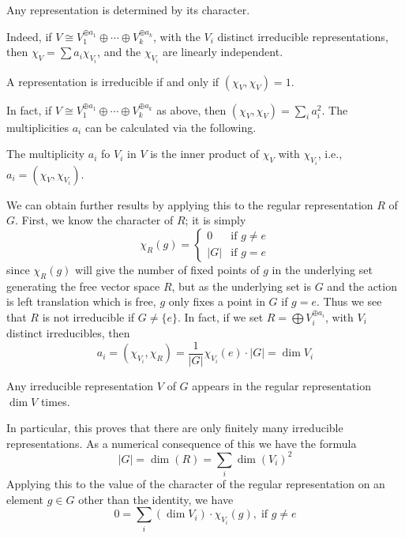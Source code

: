 \begin{corollary}
    Any representation is determined by its character.
\end{corollary}
Indeed, if $V\cong V_1^{\oplus a_1}\oplus \cdots \oplus V_k^{\oplus a_k}$, with the $V_i$ distinct irreducible representations, then $\chi_V = \sum a_i\chi_{V_i}$, and the $\chi_{V_i}$ are linearly independent.

\begin{corollary}
     A representation is irreducible if and only if $(\chi_V,\chi_V) = 1$.
\end{corollary}
In fact, if $V \cong V_1^{\oplus a_1}\oplus \cdots \oplus V_k^{\oplus a_k}$ as above, then $(\chi_V,\chi_V) = \sum_ia_i^2$. The multiplicities $a_i$ can be calculated via the following.

\begin{corollary}
    The multiplicity $a_i$ fo $V_i$ in $V$ is the inner product of $\chi_V$ with $\chi_{V_i}$, i.e., $a_i = (\chi_V,\chi_{V_i})$.
\end{corollary}

We can obtain further results by applying this to the regular representation $R$ of $G$. First, we know the character of $R$; it is simply \begin{equation*}
    \chi_R(g) = \left\{\begin{array}{lc} 0 & \text{if } g\neq e \\ |G| & \text{if } g= e\end{array}\right.
\end{equation*}
since $\chi_R(g)$ will give the number of fixed points of $g$ in the underlying set generating the free vector space $R$, but as the underlying set is $G$ and the action is left translation which is free, $g$ only fixes a point in $G$ if $g = e$. Thus we see that $R$ is not irreducible if $G \neq \{e\}$. In fact, if we set $R = \bigoplus V_i^{\oplus a_i}$, with $V_i$ distinct irreducibles, then \begin{equation*}
    a_i = (\chi_{V_i},\chi_R) = \frac{1}{|G|}\chi_{V_i}(e)\cdot|G| = \dim V_i
\end{equation*}
\begin{corollary}
    Any irreducible representation $V$ of $G$ appears in the regular representation $\dim V$ times.
\end{corollary}
In particular, this proves that there are only finitely many irreducible representations. As a numerical consequence of this we have the formula \begin{equation}
    |G| = \dim(R) = \sum_i\dim(V_i)^2
\end{equation}
Applying this to the value of the character of the regular representation on an element $g \in G$ other than the identity, we have \begin{equation}
    0 = \sum_i(\dim V_i)\cdot \chi_{V_i}(g),\;\text{if }g\neq e
\end{equation}

